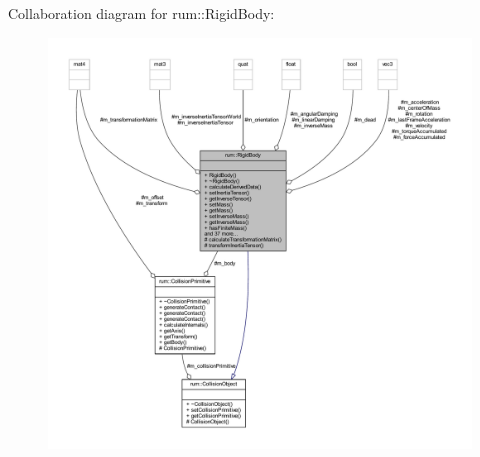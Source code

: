 Collaboration diagram for rum\+:\+:Rigid\+Body\+:\nopagebreak
\begin{figure}[H]
\begin{center}
\leavevmode
\includegraphics[width=350pt]{classrum_1_1_rigid_body__coll__graph}
\end{center}
\end{figure}
